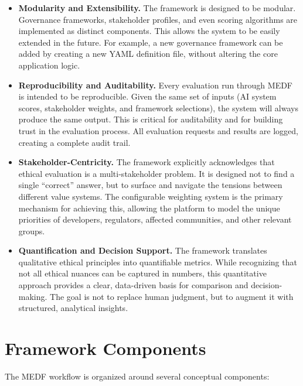 \begin{itemize}[leftmargin=2em]
  \item \textbf{Modularity and Extensibility.} The framework is designed to be modular. Governance frameworks, stakeholder profiles, and even scoring algorithms are implemented as distinct components. This allows the system to be easily extended in the future. For example, a new governance framework can be added by creating a new YAML definition file, without altering the core application logic.

  \item \textbf{Reproducibility and Auditability.} Every evaluation run through MEDF is intended to be reproducible. Given the same set of inputs (AI system scores, stakeholder weights, and framework selections), the system will always produce the same output. This is critical for auditability and for building trust in the evaluation process. All evaluation requests and results are logged, creating a complete audit trail.

  \item \textbf{Stakeholder-Centricity.} The framework explicitly acknowledges that ethical evaluation is a multi-stakeholder problem. It is designed not to find a single \enquote{correct} answer, but to surface and navigate the tensions between different value systems. The configurable weighting system is the primary mechanism for achieving this, allowing the platform to model the unique priorities of developers, regulators, affected communities, and other relevant groups.

  \item \textbf{Quantification and Decision Support.} The framework translates qualitative ethical principles into quantifiable metrics. While recognizing that not all ethical nuances can be captured in numbers, this quantitative approach provides a clear, data-driven basis for comparison and decision-making. The goal is not to replace human judgment, but to augment it with structured, analytical insights.
\end{itemize}

\section{Framework Components}
\label{sec:components}

The MEDF workflow is organized around several conceptual components:

